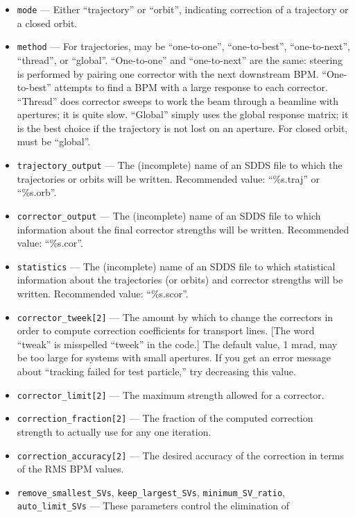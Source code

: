 \documentclass[11pt]{article}
\begin{document}
\begin{itemize}

\item \verb|mode| --- Either ``trajectory'' or ``orbit'', indicating
correction of a trajectory or a closed orbit.
\item \verb|method| --- For trajectories, may be ``one-to-one'', ``one-to-best'', ``one-to-next'', ``thread'', or ``global''.  
``One-to-one'' and ``one-to-next'' are the same: steering is performed by pairing one corrector with the next downstream BPM.
``One-to-best'' attempts to find a BPM with a large response to each corrector.  ``Thread'' does corrector sweeps to work the
beam through a beamline with apertures; it is quite slow.  ``Global'' simply uses the global response matrix; it is the best
choice if the trajectory is not lost on an aperture.
For closed orbit, must be ``global''.
\item \verb|trajectory_output| --- The (incomplete) name of an SDDS file to which the trajectories or orbits will be written.  Recommended value: ``\%s.traj'' or ``\%s.orb''.  
\item \verb|corrector_output| --- The (incomplete) name of an SDDS file to which information about the final corrector strengths will be written. Recommended value: ``\%s.cor''.  
\item \verb|statistics| --- The (incomplete) name of an SDDS file to which statistical information about the
trajectories (or orbits) and corrector strengths will be written.  Recommended value: ``\%s.scor''.
\item \verb|corrector_tweek[2]| --- The amount by which to change the correctors in order to compute correction coefficients for
transport lines.
[The word ``tweak'' is misspelled ``tweek'' in the code.]   The default value, 1 mrad, may be too large for systems with
small apertures.  If you get an error message about ``tracking failed for test particle,'' try decreasing this value.
\item \verb|corrector_limit[2]| --- The maximum strength allowed for a corrector.
\item \verb|correction_fraction[2]| --- The fraction of the computed correction strength to actually use for any one iteration.
\item \verb|correction_accuracy[2]| --- The desired accuracy of the correction in terms of the RMS BPM values.
\item \verb|remove_smallest_SVs|, \verb|keep_largest_SVs|, \verb|minimum_SV_ratio|, \verb|auto_limit_SVs| --- These parameters control the elimination of

\end{itemize}
\end{document}
